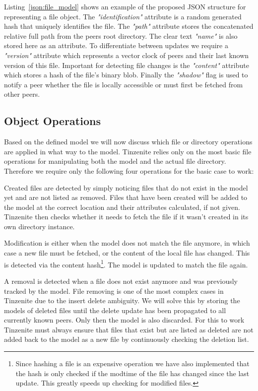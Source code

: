 Listing~\ref{json:file_model} shows an example of the proposed JSON structure for representing a file object.
The \textit{"identification"} attribute is a random generated hash that uniquely identifies the file.
The \textit{"path"} attribute stores the concatenated relative full path from the peers root directory.
The clear text \textit{"name"} is also stored here as an attribute.
To differentiate between updates we require a \textit{"version"} attribute which represents a vector clock of peers and their last known version of this file.
Important for detecting file changes is the \textit{"content"} attribute which stores a hash of the file's binary blob.
Finally the \textit{"shadow"} flag is used to notify a peer whether the file is locally accessible or must first be fetched from other peers.

\subsection{Object Operations}
\label{sub:Object Operations}

Based on the defined model we will now discuss which file or directory operations are applied in what way to the model.
Tinzenite relies only on the most basic file operations for manipulating both the model and the actual file directory.
Therefore we require only the following four operations for the basic case to work:

\begin{description}[leftmargin=5em,style=nextline,noitemsep,nolistsep]
    \item[Create]
        Created files are detected by simply noticing files that do not exist in the model yet and are not listed as removed.
        Files that have been created will be added to the model at the correct location and their attributes calculated, if not given.
        Tinzenite then checks whether it needs to fetch the file if it wasn't created in its own directory instance.
    \item[Modify]
        Modification is either when the model does not match the file anymore, in which case a new file must be fetched, or the content of the local file has changed.
        This is detected via the content hash\footnote{Since hashing a file is an expensive operation we have also implemented that the hash is only checked if the modtime of the file has changed since the last update. This greatly speeds up checking for modified files.}.
        The model is updated to match the file again.
    \item[Remove]
        A removal is detected when a file does not exist anymore and was previously tracked by the model.
        File removing is one of the most complex cases in Tinzenite due to the insert delete ambiguity.
        We will solve this by storing the models of deleted files until the delete update has been propagated to all currently known peers.
        Only then the model is also discarded.
        For this to work Tinzenite must always ensure that files that exist but are listed as deleted are not added back to the model as a new file by continuously checking the deletion list.
\end{description}

